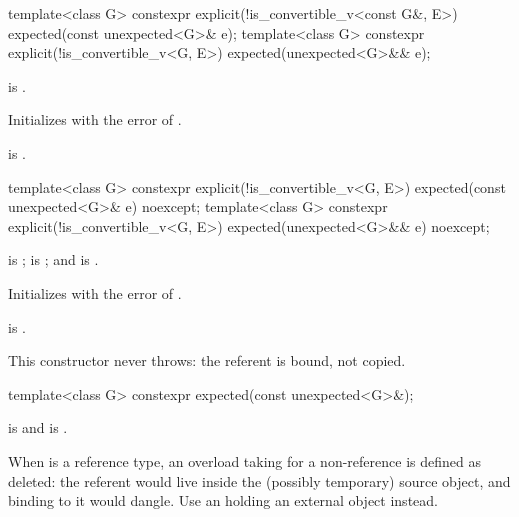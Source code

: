 %
\begin{itemdecl}
template<class G>
constexpr explicit(!is_convertible_v<const G&, E>) expected(const unexpected<G>& e);
template<class G>
constexpr explicit(!is_convertible_v<G, E>) expected(unexpected<G>&& e);
\end{itemdecl}

\begin{itemdescr}
\pnum
\constraints
{} is .

\pnum
\effects
Initializes  with the error of .

\pnum
\ensures
{} is .
\end{itemdescr}

%
\begin{itemdecl}
template<class G>
constexpr explicit(!is_convertible_v<G, E>) expected(const unexpected<G>& e) noexcept;
template<class G>
constexpr explicit(!is_convertible_v<G, E>) expected(unexpected<G>&& e) noexcept;
\end{itemdecl}

\begin{itemdescr}
\pnum
\constraints
{} is ;  is ; and  is .

\pnum
\effects
Initializes  with the error of .

\pnum
\ensures
{} is .

\pnum
\remarks
This constructor never throws: the referent is bound, not copied.
\end{itemdescr}

%
\begin{itemdecl}
template<class G> constexpr expected(const unexpected<G>&);
\end{itemdecl}

\begin{itemdescr}
\pnum
\constraints
{} is  and  is .

\pnum
\remarks
When  is a reference type, an overload taking  for a non-reference  is defined as deleted: the referent would live inside the (possibly temporary) source  object, and binding  to it would dangle. Use an  holding an external object instead.
\end{itemdescr}

